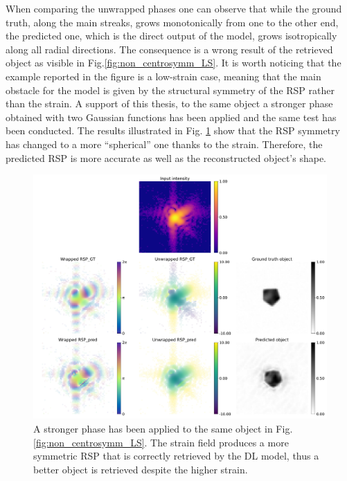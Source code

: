 When comparing the unwrapped phases one can observe that while the ground truth, along the main streaks, grows monotonically 
from one to the other end, the predicted one, which is the direct output of the model, grows isotropically along all radial 
directions. The consequence is a wrong result of the retrieved object as visible in Fig.\ref{fig:non_centrosymm_LS}. 
It is worth noticing that the example reported in the figure is a low-strain case, meaning that the main obstacle for 
the model is given by the structural symmetry of the RSP rather than the strain. 
A support of this thesis, to the same object a stronger phase obtained with two Gaussian functions has been applied and 
the same test has been conducted. The results illustrated in Fig. \ref{fig:non_centrosymm_HS} show that the RSP symmetry 
has changed to a more ``spherical'' one thanks to the strain. Therefore, the predicted RSP is more accurate as well as 
the reconstructed object's shape. 

\begin{figure}[H]
    \centering
    \includegraphics[width=\textwidth]{figures/Phasing/non_centrosymmetric_study_3d_random_HS0.pdf}
    \caption{A stronger phase has been applied to the same object in Fig. \ref{fig:non_centrosymm_LS}. The strain field 
    produces a more symmetric RSP that is correctly retrieved by the DL model, thus a better object is retrieved despite the 
    higher strain. }
    \label{fig:non_centrosymm_HS}
\end{figure}

